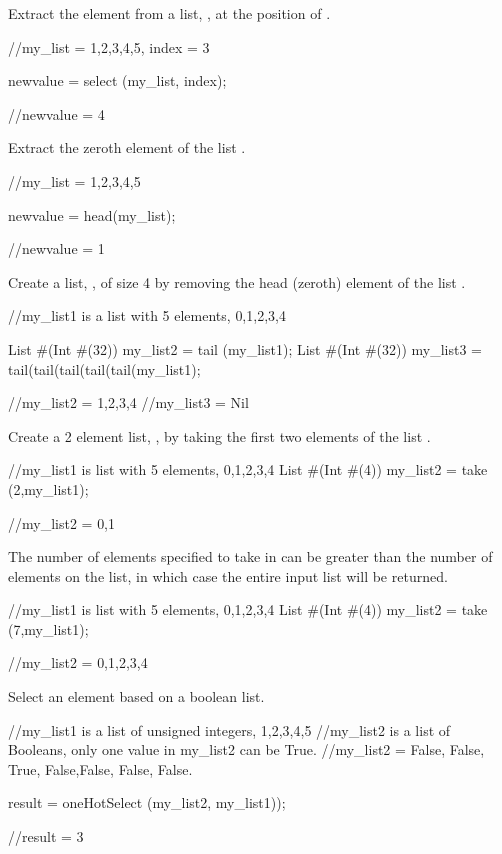 Extract the element from a list, , at the position of .
\begin{libverbatim}
     //my_list = {1,2,3,4,5}, index = 3

     newvalue = select (my_list, index);

     //newvalue = 4
\end{libverbatim}

Extract the zeroth element of the list .
\begin{libverbatim}
     //my_list = {1,2,3,4,5}

     newvalue = head(my_list);

     //newvalue = 1
\end{libverbatim}

Create a list, ,  of size 4 by removing the head (zeroth)
element of the list .
\begin{libverbatim}
     //my_list1 is a list with 5 elements, {0,1,2,3,4}

     List #(Int #(32)) my_list2 = tail (my_list1);
     List #(Int #(32)) my_list3 = tail(tail(tail(tail(tail(my_list1);

     //my_list2 = {1,2,3,4}
     //my_list3 = Nil
\end{libverbatim}

Create a 2 element list, ,  by taking the first two
elements of the list .
\begin{libverbatim}
     //my_list1 is list with 5 elements, {0,1,2,3,4}
     List #(Int #(4)) my_list2 = take (2,my_list1);

     //my_list2 = {0,1}
\end{libverbatim}

The number of elements specified to take in  can be greater than the
number of  elements  on the list, in which
case the entire input list will be returned.
\begin{libverbatim}
     //my_list1 is list with 5 elements, {0,1,2,3,4}
     List #(Int #(4)) my_list2 = take (7,my_list1);

     //my_list2 = {0,1,2,3,4}
\end{libverbatim}

Select an element based on a boolean list.
\begin{libverbatim}
     //my_list1 is a list of unsigned integers, {1,2,3,4,5}
     //my_list2 is a list of Booleans, only one value in my_list2 can be True.
     //my_list2 = {False, False, True, False,False, False, False}.

     result = oneHotSelect (my_list2, my_list1));

     //result = 3
\end{libverbatim}

